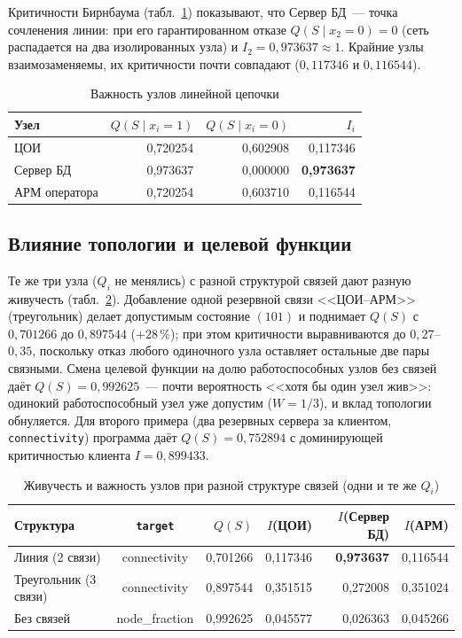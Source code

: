 \documentclass[12pt]{article}
\begin{document}
Критичности Бирнбаума (табл.~\ref{tab:importance}) показывают, что Сервер
БД~--- точка сочленения линии: при его гарантированном отказе $Q(S \mid
x_2 = 0) = 0$ (сеть распадается на два изолированных узла) и $I_2 =
0{,}973637 \approx 1$. Крайние узлы взаимозаменяемы, их критичности почти
совпадают ($0{,}117346$ и $0{,}116544$).

\begin{table}[htb]
\centering
\caption{Важность узлов линейной цепочки}
\label{tab:importance}
\begin{tabular}{@{}lrrr@{}}
\toprule
Узел & $Q(S \mid x_i = 1)$ & $Q(S \mid x_i = 0)$ & $I_i$ \\
\midrule
ЦОИ & 0{,}720254 & 0{,}602908 & 0{,}117346 \\
Сервер БД & 0{,}973637 & 0{,}000000 & \textbf{0{,}973637} \\
АРМ оператора & 0{,}720254 & 0{,}603710 & 0{,}116544 \\
\bottomrule
\end{tabular}
\end{table}

\subsection{Влияние топологии и целевой функции}

Те же три узла ($Q_i$ не менялись) с разной структурой связей дают разную
живучесть (табл.~\ref{tab:topologies}). Добавление одной резервной связи
<<ЦОИ--АРМ>> (треугольник) делает допустимым состояние $(101)$ и поднимает
$Q(S)$ с $0{,}701266$ до $0{,}897544$ ($+28\,\%$); при этом критичности
выравниваются до $0{,}27$--$0{,}35$, поскольку отказ любого одиночного
узла оставляет остальные две пары связными. Смена целевой функции на долю
работоспособных узлов без связей даёт $Q(S) = 0{,}992625$~--- почти
вероятность <<хотя бы один узел жив>>: одинокий работоспособный узел уже
допустим ($W = 1/3$), и вклад топологии обнуляется. Для второго примера
(два резервных сервера за клиентом, \texttt{connectivity}) программа даёт
$Q(S) = 0{,}752894$ с доминирующей критичностью клиента $I = 0{,}899433$.

\begin{table}[htb]
\centering
\caption{Живучесть и важность узлов при разной структуре связей
(одни и те же $Q_i$)}
\label{tab:topologies}
{\small
\begin{tabular}{@{}lcrrrr@{}}
\toprule
Структура & \texttt{target} & $Q(S)$ & $I$(ЦОИ) & $I$(Сервер БД) &
$I$(АРМ) \\
\midrule
Линия (2 связи) & connectivity & 0{,}701266 & 0{,}117346 &
\textbf{0{,}973637} & 0{,}116544 \\
Треугольник (3 связи) & connectivity & 0{,}897544 & 0{,}351515 &
0{,}272008 & 0{,}351024 \\
Без связей & node\_fraction & 0{,}992625 & 0{,}045577 & 0{,}026363 &
0{,}045266 \\
\bottomrule
\end{tabular}}
\end{table}
\end{document}
